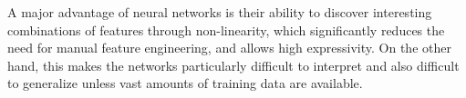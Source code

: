A major advantage of neural networks is their ability to discover
interesting combinations of features through non-linearity, which
significantly reduces the need for manual feature engineering, and
allows high expressivity.
%
On the other hand, this makes the networks particularly difficult to
interpret and also difficult to generalize unless vast amounts of
training data are available.

%
%
%
%
%

%
%
%

%

%
%
%
%

